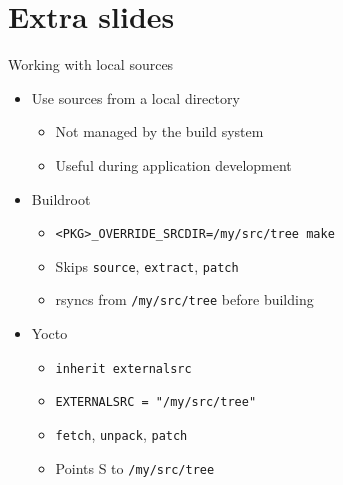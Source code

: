 \documentclass[xetex,table,aspectratio=43]{beamer}
\begin{document}
\appendix

\section{Extra slides}

\begin{frame}{Working with local sources}
  \begin{itemize}
  \item Use sources from a local directory
    \begin{itemize}
    \item Not managed by the build system
    \item Useful during application development
    \end{itemize}
  \item Buildroot
    \begin{itemize}
    \item {\tt <PKG>\_OVERRIDE\_SRCDIR=/my/src/tree make}
    \item Skips {\tt source}, {\tt extract}, {\tt patch}
    \item rsyncs from {\tt /my/src/tree} before building
    \end{itemize}
  \item Yocto
    \begin{itemize}
    \item {\tt inherit externalsrc}
    \item {\tt EXTERNALSRC = "/my/src/tree"}
    \item {\tt fetch}, {\tt unpack}, {\tt patch}
    \item Points {S} to {\tt /my/src/tree}
    \end{itemize}
  \end{itemize}
\end{frame}
\end{document}
